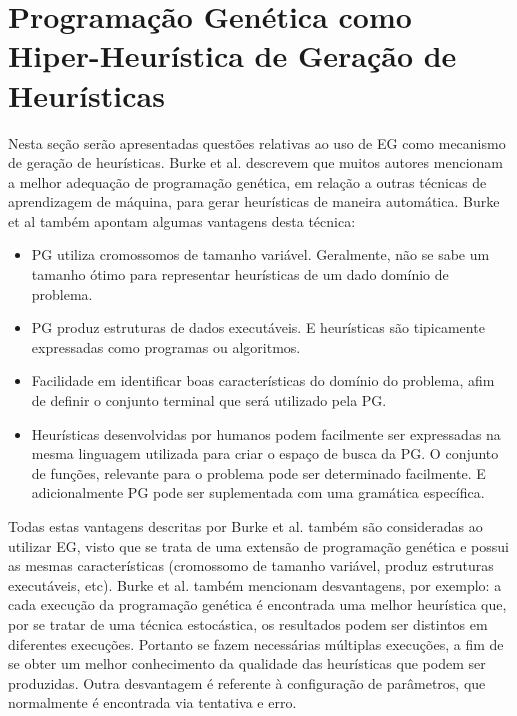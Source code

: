 \section{Programação Genética como Hiper-Heurística de Geração de Heurísticas}
\label{subsubsection:PGasHH}

Nesta seção serão apresentadas questões relativas ao uso de EG como mecanismo de geração de heurísticas. 
Burke et al. \cite{burke2009exploring} descrevem que muitos autores mencionam a melhor adequação de programação genética, em relação a outras técnicas de aprendizagem de máquina, para gerar heurísticas de maneira automática. Burke et al \cite{burke2009exploring} também apontam algumas vantagens desta técnica:

\begin{itemize}
	\item PG utiliza cromossomos de tamanho variável. Geralmente, não se sabe um tamanho ótimo para representar heurísticas de um dado domínio de problema.
	\item PG produz estruturas de dados executáveis. E heurísticas são tipicamente expressadas como programas ou algoritmos.
	\item Facilidade em identificar boas características do domínio do problema, afim de definir o conjunto terminal que será utilizado pela PG.
	\item Heurísticas desenvolvidas por humanos podem facilmente ser expressadas na mesma linguagem utilizada para criar o espaço de busca da PG. O conjunto de funções, relevante para o problema pode ser determinado facilmente. E adicionalmente PG pode ser suplementada com uma gramática específica.
\end{itemize}

Todas estas vantagens descritas por Burke et al. \cite{burke2009exploring} também são consideradas ao utilizar EG, visto que se trata de uma extensão de programação genética e possui as mesmas características (cromossomo de tamanho variável, produz estruturas executáveis, etc).
Burke et al. \cite{burke2009exploring} também mencionam desvantagens, por exemplo: a cada execução da programação genética é encontrada uma melhor heurística que, por se tratar de uma técnica estocástica, os resultados podem ser distintos em diferentes execuções. Portanto se fazem necessárias múltiplas execuções, a fim de se obter um melhor conhecimento da qualidade das heurísticas que podem ser produzidas. Outra desvantagem é referente à configuração de parâmetros, que normalmente é encontrada via tentativa e erro.

